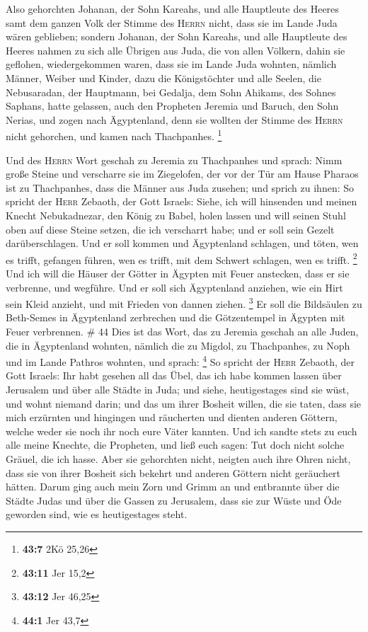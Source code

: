  Also gehorchten Johanan, der Sohn Kareahs, und alle
Hauptleute des Heeres samt dem ganzen Volk der Stimme des \textsc{Herrn}
nicht, dass sie im Lande Juda wären geblieben;  sondern
Johanan, der Sohn Kareahs, und alle Hauptleute des Heeres nahmen zu sich
alle Übrigen aus Juda, die von allen Völkern, dahin sie geflohen,
wiedergekommen waren, dass sie im Lande Juda wohnten, 
nämlich Männer, Weiber und Kinder, dazu die Königstöchter und alle
Seelen, die Nebusaradan, der Hauptmann, bei Gedalja, dem Sohn Ahikams,
des Sohnes Saphans, hatte gelassen, auch den Propheten Jeremia und
Baruch, den Sohn Nerias,  und zogen nach Ägyptenland, denn
sie wollten der Stimme des \textsc{Herrn} nicht gehorchen, und kamen
nach Thachpanhes. \footnote{\textbf{43:7} 2Kö 25,26}

 Und des \textsc{Herrn} Wort geschah zu Jeremia zu
Thachpanhes und sprach:  Nimm große Steine und verscharre
sie im Ziegelofen, der vor der Tür am Hause Pharaos ist zu Thachpanhes,
dass die Männer aus Juda zusehen;  und sprich zu ihnen:
So spricht der \textsc{Herr} Zebaoth, der Gott Israels: Siehe, ich will
hinsenden und meinen Knecht Nebukadnezar, den König zu Babel, holen
lassen und will seinen Stuhl oben auf diese Steine setzen, die ich
verscharrt habe; und er soll sein Gezelt darüberschlagen.
 Und er soll kommen und Ägyptenland schlagen, und töten,
wen es trifft, gefangen führen, wen es trifft, mit dem Schwert schlagen,
wen es trifft. \footnote{\textbf{43:11} Jer 15,2}  Und
ich will die Häuser der Götter in Ägypten mit Feuer anstecken, dass er
sie verbrenne, und wegführe. Und er soll sich Ägyptenland anziehen, wie
ein Hirt sein Kleid anzieht, und mit Frieden von dannen ziehen.
\footnote{\textbf{43:12} Jer 46,25}  Er soll die
Bildsäulen zu Beth-Semes in Ägyptenland zerbrechen und die Götzentempel
in Ägypten mit Feuer verbrennen. \# 44  Dies ist das Wort,
das zu Jeremia geschah an alle Juden, die in Ägyptenland wohnten,
nämlich die zu Migdol, zu Thachpanhes, zu Noph und im Lande Pathros
wohnten, und sprach: \footnote{\textbf{44:1} Jer 43,7}  So
spricht der \textsc{Herr} Zebaoth, der Gott Israels: Ihr habt gesehen
all das Übel, das ich habe kommen lassen über Jerusalem und über alle
Städte in Juda; und siehe, heutigestages sind sie wüst, und wohnt
niemand darin;  und das um ihrer Bosheit willen, die sie
taten, dass sie mich erzürnten und hingingen und räucherten und dienten
anderen Göttern, welche weder sie noch ihr noch eure Väter kannten.
 Und ich sandte stets zu euch alle meine Knechte, die
Propheten, und ließ euch sagen: Tut doch nicht solche Gräuel, die ich
hasse.  Aber sie gehorchten nicht, neigten auch ihre Ohren
nicht, dass sie von ihrer Bosheit sich bekehrt und anderen Göttern nicht
geräuchert hätten.  Darum ging auch mein Zorn und Grimm an
und entbrannte über die Städte Judas und über die Gassen zu Jerusalem,
dass sie zur Wüste und Öde geworden sind, wie es heutigestages steht.

